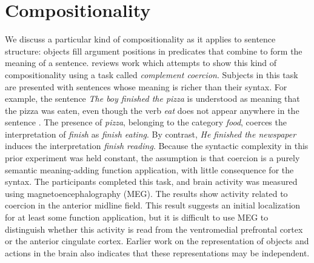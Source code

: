 \section{Compositionality}
\label{sec:compositionality}

We discuss a particular kind of compositionality as it applies to sentence
structure: objects fill argument positions in predicates that combine to form
the meaning of a sentence.
%
\citet{pylkkanen2011grounding} reviews work which attempts to show this kind of
compositionality using a task called \emph{complement coercion}.
%
Subjects in this task are presented with sentences whose meaning is richer
than their syntax.
%
For example, the sentence \emph{The boy finished the pizza} is understood as
meaning that the pizza was eaten, even though the verb \emph{eat} does not
appear anywhere in the sentence \citep{pustejovsky1995}.
%
The presence of \emph{pizza}, belonging to the category \emph{food}, coerces
the interpretation of \emph{finish} as \emph{finish eating}.
%
By contrast, \emph{He finished the newspaper} induces the interpretation
\emph{finish reading}.
%
Because the syntactic complexity in this prior experiment was held constant, the
assumption is that coercion is a purely semantic meaning-adding function
application, with little consequence for the syntax.
%
The participants completed this task, and brain activity was measured using
magnetoencephalography (MEG).
%
The results show activity related to coercion in the anterior midline field.
%
This result suggests an initial localization for at least some function
application, but it is difficult to use MEG to distinguish whether this
activity is read from the ventromedial prefrontal cortex or the anterior
cingulate cortex.
%
Earlier work on the representation of objects and actions in the brain also
indicates that these representations may be independent.

\vspace*{-2.4ex}
